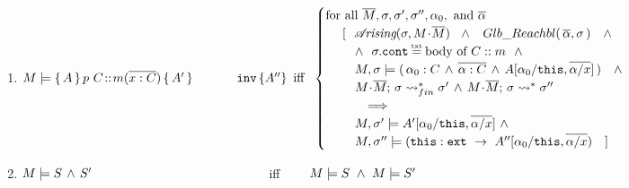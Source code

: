 \begin{definition}
\begin{enumerate}
  \item
$ %
 \satisfies{M}{\mprepostNTwo{A}{p\ C}{m}{x}{C}{A'} {A''}}
 \ \,  \mbox{iff}  \   \ 
    \begin{cases}
     \mbox{for all }   \Mtwo,  \sigma, \sigma',\sigma'', \alpha_0, \mbox{ and }  \overline{\alpha}    \\
   \ \ \ \  [ \ \ { \arising{\sigma}{M\madd \Mtwo }\   \  \wedge\ \ \GRelevant {\overline \alpha}  \sigma}\ \ \ \wedge  \\
  \ \ \ \  \ \ \  \wedge \ \  \sigma.\prg{cont}\txteq \mbox{body of $C::m$} \ \ \wedge  \\
  \ \ \ \  \ \ \  \satisfiesA {M}   {\sigma}  {(\, \alpha_0:C \, \wedge\, \overline {\alpha:C} \, \wedge\,  {A[\alpha_0/\prg{this},\overline{\alpha/x}]}\, ) } \ \ \ \wedge   \\
   \ \ \   \ \ \  \ {\leadstoBoundedStarFin {M\madd \Mtwo}{\sigma}  {\sigma'} }  \, \wedge  \, {\leadstoBoundedStar  {M\madd \Mtwo}{\sigma}  {\sigma''} } \\
 \ \ \ \   \ \ \ \ \  \ \Longrightarrow   \\
 \ \ \ \   \ \ \  {\satisfiesA{M}{\sigma'}{ A'[\alpha_0/\prg{this},\overline{\alpha/x}]}  }\ \wedge\\
 \ \ \ \   \ \ \      {\satisfiesA{M}{\sigma''}{ ( \external{\prg{this}}\ \rightarrow\ A''[\alpha_0/\prg{this},\overline{\alpha/x}})}\ \  \ ]
    \end{cases} 
    $
 \item
 $M \models S\, \wedge\, S'$\ \ \ \ \ \  \ \ \ \ \ \ \ \ \ \ \ \ \ \ \ \ \ \ \  \ \ \  iff  \  \ \  \   $M \models S\ \wedge \ M \models S'$
\end{enumerate}
\end{definition}

